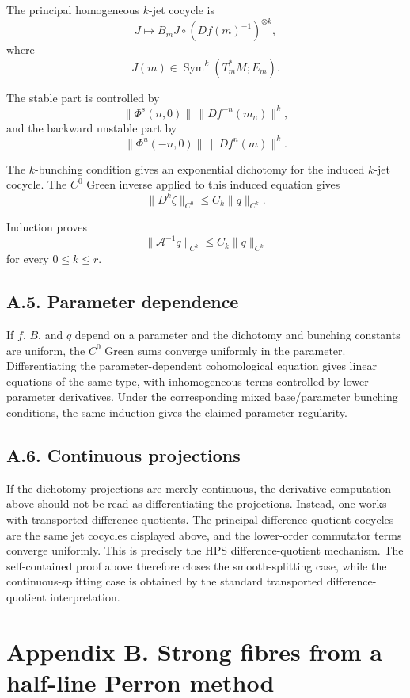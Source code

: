 \documentclass[12pt,a4paper]{article}
\theoremstyle{plain}
\numberwithin{equation}{section}
\numberwithin{theorem}{section}
\begin{document}
The principal homogeneous $k$-jet cocycle is
\[
J\mapsto B_mJ\circ(Df(m)^{-1})^{\otimes k},
\]
where
\[
J(m)\in \operatorname{Sym}^k(T_m^*M;E_m).
\]

The stable part is controlled by
\[
\|\Phi^s(n,0)\|\,\|Df^{-n}(m_n)\|^k,
\]
and the backward unstable part by
\[
\|\Phi^u(-n,0)\|\,\|Df^n(m)\|^k.
\]

The $k$-bunching condition gives an exponential dichotomy for the induced $k$-jet cocycle. The $C^0$ Green inverse applied to this induced equation gives
\[
\|D^k\zeta\|_{C^0}\le C_k\|q\|_{C^k}.
\]

Induction proves
\[
\|\mathcal A^{-1}q\|_{C^k}\le C_k\|q\|_{C^k}
\]
for every $0\le k\le r$.

\subsection{A.5. Parameter dependence}

If $f$, $B$, and $q$ depend on a parameter and the dichotomy and bunching constants are uniform, the $C^0$ Green sums converge uniformly in the parameter. Differentiating the parameter-dependent cohomological equation gives linear equations of the same type, with inhomogeneous terms controlled by lower parameter derivatives. Under the corresponding mixed base/parameter bunching conditions, the same induction gives the claimed parameter regularity.

\subsection{A.6. Continuous projections}

If the dichotomy projections are merely continuous, the derivative computation above should not be read as differentiating the projections. Instead, one works with transported difference quotients. The principal difference-quotient cocycles are the same jet cocycles displayed above, and the lower-order commutator terms converge uniformly. This is precisely the HPS difference-quotient mechanism. The self-contained proof above therefore closes the smooth-splitting case, while the continuous-splitting case is obtained by the standard transported difference-quotient interpretation.

\clearpage

\section{Appendix B. Strong fibres from a half-line Perron method}
\end{document}
